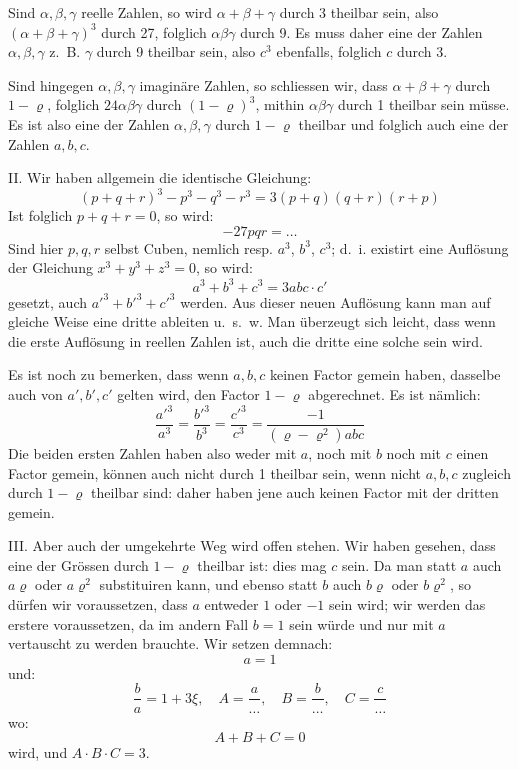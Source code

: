 \documentclass[12pt,a4paper]{article}
\begin{document}
Sind $\alpha, \beta, \gamma$ reelle Zahlen, so wird $\alpha + \beta + \gamma$ durch 3 theilbar sein, also $(\alpha + \beta + \gamma)^3$ durch 27, folglich $\alpha\beta\gamma$ durch 9. Es muss daher eine der Zahlen $\alpha, \beta, \gamma$ z.~B. $\gamma$ durch 9 theilbar sein, also $c^3$ ebenfalls, folglich $c$ durch 3.

Sind hingegen $\alpha, \beta, \gamma$ imaginäre Zahlen, so schliessen wir, dass $\alpha + \beta + \gamma$ durch $1 - \varrho$, folglich $24\alpha\beta\gamma$ durch $(1 - \varrho)^3$, mithin $\alpha\beta\gamma$ durch 1 theilbar sein müsse. Es ist also eine der Zahlen $\alpha, \beta, \gamma$ durch $1 - \varrho$ theilbar und folglich auch eine der Zahlen $a, b, c$.

II. Wir haben allgemein die identische Gleichung:
\[
(p + q + r)^3 - p^3 - q^3 - r^3 = 3(p + q)(q + r)(r + p)
\]
Ist folglich $p + q + r = 0$, so wird:
\[
-27pqr = \ldots
\]
Sind hier $p, q, r$ selbst Cuben, nemlich resp. $a^3$, $b^3$, $c^3$; d.~i. existirt eine Auflösung der Gleichung $x^3 + y^3 + z^3 = 0$, so wird:
\[
a^3 + b^3 + c^3 = 3abc \cdot c'
\]
gesetzt, auch $a'^3 + b'^3 + c'^3$ werden. Aus dieser neuen Auflösung kann man auf gleiche Weise eine dritte ableiten u.~s.~w. Man überzeugt sich leicht, dass wenn die erste Auflösung in reellen Zahlen ist, auch die dritte eine solche sein wird.

Es ist noch zu bemerken, dass wenn $a, b, c$ keinen Factor gemein haben, dasselbe auch von $a', b', c'$ gelten wird, den Factor $1 - \varrho$ abgerechnet. Es ist nämlich:
\[
\frac{a'^3}{a^3} = \frac{b'^3}{b^3} = \frac{c'^3}{c^3} = \frac{-1}{(\varrho - \varrho^2)abc}
\]
Die beiden ersten Zahlen haben also weder mit $a$, noch mit $b$ noch mit $c$ einen Factor gemein, können auch nicht durch 1 theilbar sein, wenn nicht $a, b, c$ zugleich durch $1 - \varrho$ theilbar sind: daher haben jene auch keinen Factor mit der dritten gemein.

III. Aber auch der umgekehrte Weg wird offen stehen. Wir haben gesehen, dass eine der Grössen durch $1 - \varrho$ theilbar ist: dies mag $c$ sein. Da man statt $a$ auch $a\varrho$ oder $a\varrho^2$ substituiren kann, und ebenso statt $b$ auch $b\varrho$ oder $b\varrho^2$, so dürfen wir voraussetzen, dass $a$ entweder $1$ oder $-1$ sein wird; wir werden das erstere voraussetzen, da im andern Fall $b = 1$ sein würde und nur mit $a$ vertauscht zu werden brauchte. Wir setzen demnach:
\[
a = 1
\]
und:
\[
\frac{b}{a} = 1 + 3\xi, \quad A = \frac{a}{\ldots}, \quad B = \frac{b}{\ldots}, \quad C = \frac{c}{\ldots}
\]
wo:
\[
A + B + C = 0
\]
 wird, und $A \cdot B \cdot C = 3$.
\end{document}
